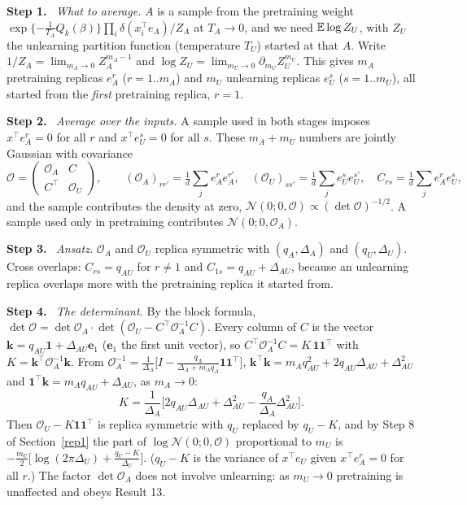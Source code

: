 \documentclass[10pt]{article}
\newcommand{\step}[1]{\par\smallskip\textbf{Step #1.}\ }
\begin{document}
\step1 \emph{What to average.} $A$ is a sample from the pretraining weight $\exp\{-\frac1{T_A}Q_k(\beta)\}\prod_i\delta(x_i^\top e_A)/Z_A$ at $T_A\to0$, and we need $\mathbb E\log Z_U$, with $Z_U$ the unlearning partition function (temperature $T_U$) started at that $A$. Write $1/Z_A=\lim_{m_A\to0}Z_A^{m_A-1}$ and $\log Z_U=\lim_{m_U\to0}\partial_{m_U}Z_U^{m_U}$. This gives $m_A$ pretraining replicas $e_A^r$ ($r=1..m_A$) and $m_U$ unlearning replicas $e_U^s$ ($s=1..m_U$), all started from the \emph{first} pretraining replica, $r=1$.
\step2 \emph{Average over the inputs.} A sample used in both stages imposes $x^\top e_A^r=0$ for all $r$ and $x^\top e_U^s=0$ for all $s$. These $m_A+m_U$ numbers are jointly Gaussian with covariance
\[
\mathcal O=\begin{pmatrix}\mathcal O_A&C\\ C^\top&\mathcal O_U\end{pmatrix},\qquad(\mathcal O_A)_{rr'}=\tfrac1d\textstyle\sum_je_A^re_A^{r'},\quad(\mathcal O_U)_{ss'}=\tfrac1d\sum_je_U^se_U^{s'},\quad C_{rs}=\tfrac1d\sum_je_A^re_U^s ,
\]
and the sample contributes the density at zero, $\mathcal N(0;0,\mathcal O)\propto(\det\mathcal O)^{-1/2}$. A sample used only in pretraining contributes $\mathcal N(0;0,\mathcal O_A)$.
\step3 \emph{Ansatz.} $\mathcal O_A$ and $\mathcal O_U$ replica symmetric with $(q_A,\Delta_A)$ and $(q_U,\Delta_U)$. Cross overlaps: $C_{rs}=q_{AU}$ for $r\neq1$ and $C_{1s}=q_{AU}+\Delta_{AU}$, because an unlearning replica overlaps more with the pretraining replica it started from.
\step4 \emph{The determinant.} By the block formula, $\det\mathcal O=\det\mathcal O_A\cdot\det(\mathcal O_U-C^\top\mathcal O_A^{-1}C)$. Every column of $C$ is the vector $\mathbf k=q_{AU}\mathbf 1+\Delta_{AU}\mathbf e_1$ ($\mathbf e_1$ the first unit vector), so $C^\top\mathcal O_A^{-1}C=K\,\mathbf 1\mathbf 1^\top$ with $K=\mathbf k^\top\mathcal O_A^{-1}\mathbf k$. From $\mathcal O_A^{-1}=\frac1{\Delta_A}\big[I-\frac{q_A}{\Delta_A+m_Aq_A}\mathbf 1\mathbf 1^\top\big]$, $\mathbf k^\top\mathbf k=m_Aq_{AU}^2+2q_{AU}\Delta_{AU}+\Delta_{AU}^2$ and $\mathbf 1^\top\mathbf k=m_Aq_{AU}+\Delta_{AU}$, as $m_A\to0$:
\[
K=\frac1{\Delta_A}\Big[2q_{AU}\Delta_{AU}+\Delta_{AU}^2-\frac{q_A}{\Delta_A}\Delta_{AU}^2\Big].
\]
Then $\mathcal O_U-K\mathbf 1\mathbf 1^\top$ is replica symmetric with $q_U$ replaced by $q_U-K$, and by Step 8 of Section~\ref{rep1} the part of $\log\mathcal N(0;0,\mathcal O)$ proportional to $m_U$ is $-\frac{m_U}2\big[\log(2\pi\Delta_U)+\frac{q_U-K}{\Delta_U}\big]$. ($q_U-K$ is the variance of $x^\top e_U$ given $x^\top e_A^r=0$ for all $r$.) The factor $\det\mathcal O_A$ does not involve unlearning: as $m_U\to0$ pretraining is unaffected and obeys Result 13.
\end{document}
